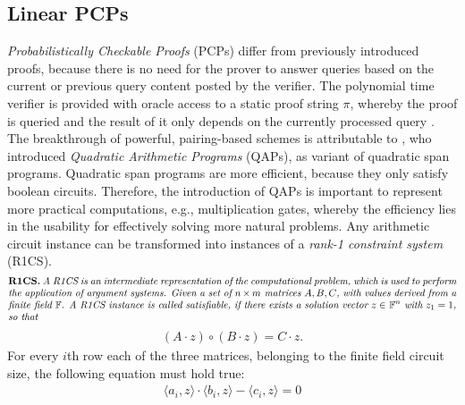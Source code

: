 \subsection{Linear PCPs}
\textit{Probabilistically Checkable Proofs} (PCPs) differ from previously introduced proofs, because there is no need for the prover to answer queries based on the current or previous query content posted by the verifier. The polynomial time verifier is provided with oracle access to a static proof string \begin{math} \pi \end{math}, whereby the proof is queried and the result of it only depends on the currently processed query \citep{PCP}. The breakthrough of powerful, pairing-based schemes is attributable to \citet{GennaroLinPCP}, who introduced \textit{Quadratic Arithmetic Programs} (QAPs), as variant of quadratic span programs. Quadratic span programs are more efficient, because they only satisfy boolean circuits. Therefore, the introduction of QAPs is important to represent more practical computations, e.g., multiplication gates, whereby the efficiency lies in the usability for effectively solving more natural problems. Any arithmetic circuit instance can be transformed into instances of a \textit{rank-1 constraint system} (R1CS).
\begin{align*}
    \text{\parbox{450pt}{\textbf{R1CS.} \textit{A R1CS is an intermediate representation of the computational problem, which is used to perform the application of argument systems. Given a set of \(n \times m \text{ matrices} \ A, B, C\), with values derived from a finite field \begin{math} \mathbb{F} \end{math}. A R1CS instance is called satisfiable, if there exists a solution vector \(z \in\) \begin{math} \mathbb{F}^n \end{math} with \(z_1 = 1\), so that}}}
\end{align*}
\begin{align*}
    (A \cdot z) \circ (B \cdot z) = C \cdot z.
\end{align*}
For every \(i\)th row each of the three matrices, belonging to the finite field circuit size, the following equation must hold true:
\begin{align}
    \langle a_i, z \rangle \cdot \langle b_i, z \rangle - \langle c_i, z\rangle = 0 
\end{align}

